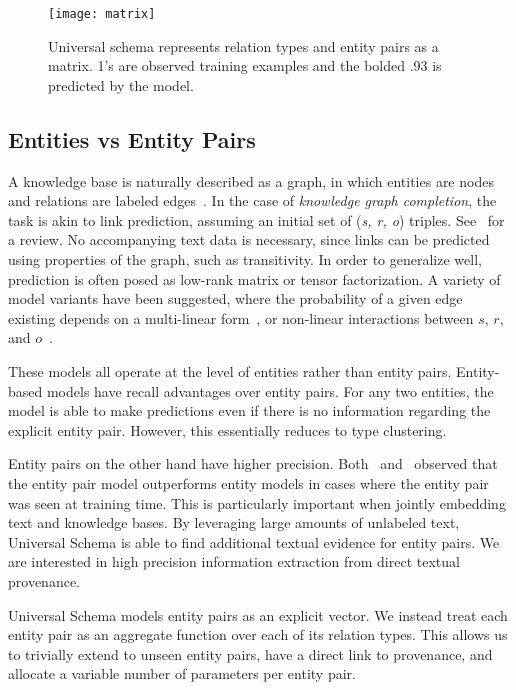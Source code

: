 \begin{figure}[h]
\caption{Universal schema represents relation types and entity pairs as a matrix.
1's are observed training examples and the bolded .93 is predicted by the model.
\label{fig:uschema-matrix}}
\centering
\texttt{[image: matrix]}
\end{figure}



\subsection {Entities vs Entity Pairs}

A knowledge base is naturally described as a graph, in which entities are nodes and relations are labeled edges~\citep{yago,freebase}.
In the case of \emph{knowledge graph completion}, the task is akin to link prediction, assuming an initial set of (\emph{s, r, o}) triples.
See~\citet{nickel2015review} for a review.
No accompanying text data is necessary, since links can be predicted using properties of the graph, such as transitivity.
In order to generalize well, prediction is often posed as low-rank matrix or tensor factorization.
A variety of model variants have been suggested, where the probability of a given edge existing depends on a multi-linear form~\citep{rescal,DBLP:journals/corr/Garcia-DuranBUG15,bishan,transe,wang2014knowledge,lin2015learning}, or non-linear interactions between $s$, $r$, and $o$~\citep{socherkb}.

These models all operate at the level of entities rather than entity pairs.
Entity-based models have recall advantages over entity pairs.
For any two entities, the model is able to make predictions even if there is no information regarding the explicit entity pair.
However, this essentially reduces to type clustering.

Entity pairs on the other hand have higher precision.
Both~\citet{toutanova2015representing} and~\citet{limin} observed that the entity pair model outperforms entity models in cases where the entity pair was seen at training time.
This is particularly important when jointly embedding text and knowledge bases.
By leveraging large amounts of unlabeled text, Universal Schema is able to find additional textual evidence for entity pairs.
We are interested in high precision information extraction from direct textual provenance.

Universal Schema models entity pairs  as an explicit vector.
We instead treat each entity pair as an aggregate function over each of its relation types.
This allows us to trivially extend to unseen entity pairs, have a direct link to provenance, and allocate a variable number of parameters per entity pair.


